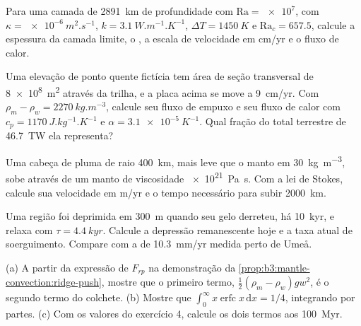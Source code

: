 \begin{exercise}[$\star\star$]\label{exo:b3:mantle-convection:6}
Para uma camada de \qty{2891}{km} de profundidade com $\mathrm{Ra} = \num{e7}$, com $\kappa =
\qty{e-6}{m^2.s^{-1}}$, $k = \qty{3.1}{W.m^{-1}.K^{-1}}$, $\Delta T =
\qty{1450}{K}$ e $\mathrm{Ra}_c = 657.5$, calcule a espessura da camada limite,
o , a escala de velocidade em \unit{cm/yr} e o
fluxo de calor.
\end{exercise}

\begin{exercise}[$\star\star$]\label{exo:b3:mantle-convection:7}
Uma elevação de ponto quente fictícia tem área de seção transversal de \qty{8e8}{m^2} através
da trilha, e a placa acima se move a \qty{9}{cm/yr}. Com $\rho_m - \rho_w =
\qty{2270}{kg.m^{-3}}$, calcule seu fluxo de empuxo e seu fluxo de calor com $c_p =
\qty{1170}{J.kg^{-1}.K^{-1}}$ e $\alpha = \qty{3.1e-5}{K^{-1}}$. Qual fração
do total terrestre de \qty{46.7}{TW} ela representa?
\end{exercise}

\begin{exercise}[$\star\star$]\label{exo:b3:mantle-convection:8}
Uma cabeça de pluma de raio \qty{400}{km}, mais leve que o manto em
\qty{30}{kg.m^{-3}}, sobe através de um manto de viscosidade \qty{e21}{Pa.s}. Com
a lei de Stokes, calcule sua velocidade em \unit{m/yr} e o tempo necessário para subir
\qty{2000}{km}.
\end{exercise}

\begin{exercise}[$\star\star$]\label{exo:b3:mantle-convection:9}
Uma região foi deprimida em \qty{300}{m} quando seu gelo derreteu, há \qty{10}{kyr},
e relaxa com $\tau = \qty{4.4}{kyr}$. Calcule a depressão remanescente hoje e
a taxa atual de soerguimento. Compare com a de \qty{10.3}{mm/yr} medida perto de
Umeå.
\end{exercise}

\begin{exercise}[$\star\star\star$]\label{exo:b3:mantle-convection:10}
(a) A partir da expressão de $F_{rp}$ na demonstração
da \cref{prop:b3:mantle-convection:ridge-push}, mostre que o primeiro termo,
$\tfrac12(\rho_m - \rho_w)gw^2$, é o segundo termo do colchete. (b) Mostre que
$\int_0^\infty x\operatorname{erfc}x\,\mathrm dx = 1/4$, integrando por partes.
(c) Com os valores do exercício 4, calcule os dois termos aos \qty{100}{Myr}.
\end{exercise}

